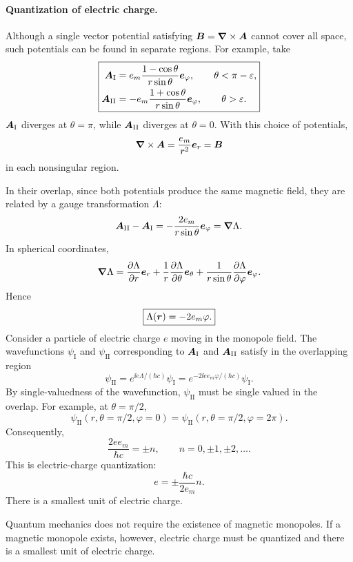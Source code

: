 \paragraph{Quantization of electric charge.}
Although a single vector potential satisfying $\bm{B}=\bm{\nabla}\times\bm{A}$ cannot cover all space, such potentials can be found in separate regions. For example, take
\begin{equation}
\boxed{\begin{aligned}
\bm{A}_{\mathrm I}&=e_m\frac{1-\cos\theta}{r\sin\theta}\bm{e}_\varphi,
\qquad\theta<\pi-\varepsilon,\\
\bm{A}_{\mathrm{II}}&=-e_m\frac{1+\cos\theta}{r\sin\theta}\bm{e}_\varphi,
\qquad\theta>\varepsilon.
\end{aligned}}
\end{equation}
$\bm{A}_{\mathrm I}$ diverges at $\theta=\pi$, while $\bm{A}_{\mathrm{II}}$ diverges at $\theta=0$. With this choice of potentials,
\begin{equation}
\bm{\nabla}\times\bm{A}=\frac{e_m}{r^2}\bm{e}_r=\bm{B}
\end{equation}
in each nonsingular region.

In their overlap, since both potentials produce the same magnetic field, they are related by a gauge transformation $\Lambda$:
\begin{equation}
\bm{A}_{\mathrm{II}}-\bm{A}_{\mathrm I}
=-\frac{2e_m}{r\sin\theta}\bm{e}_\varphi=\bm{\nabla}\Lambda.
\end{equation}
In spherical coordinates,
\begin{equation}
\bm{\nabla}\Lambda=\frac{\partial\Lambda}{\partial r}\bm{e}_r
+\frac1r\frac{\partial\Lambda}{\partial\theta}\bm{e}_\theta
+\frac1{r\sin\theta}\frac{\partial\Lambda}{\partial\varphi}\bm{e}_\varphi.
\end{equation}
Hence
\begin{equation}
\boxed{\Lambda(\bm{r})=-2e_m\varphi.}
\end{equation}
Consider a particle of electric charge $e$ moving in the monopole field. The wavefunctions $\psi_{\mathrm I}$ and $\psi_{\mathrm{II}}$ corresponding to $\bm{A}_{\mathrm I}$ and $\bm{A}_{\mathrm{II}}$ satisfy in the overlapping region
\begin{equation}
\psi_{\mathrm{II}}=e^{\ii e\Lambda/(\hbar c)}\psi_{\mathrm I}
=e^{-2\ii ee_m\varphi/(\hbar c)}\psi_{\mathrm I}.
\end{equation}
By single-valuedness of the wavefunction, $\psi_{\mathrm{II}}$ must be single valued in the overlap. For example, at $\theta=\pi/2$,
\begin{equation}
\psi_{\mathrm{II}}(r,\theta=\pi/2,\varphi=0)
=\psi_{\mathrm{II}}(r,\theta=\pi/2,\varphi=2\pi).
\end{equation}
Consequently,
\begin{equation}
\frac{2ee_m}{\hbar c}=\pm n,\qquad n=0,\pm1,\pm2,\ldots.
\end{equation}
This is electric-charge quantization:
\begin{equation}
\boxed{e=\pm\frac{\hbar c}{2e_m}n.}
\end{equation}
There is a smallest unit of electric charge.

Quantum mechanics does not require the existence of magnetic monopoles. If a magnetic monopole exists, however, electric charge must be quantized and there is a smallest unit of electric charge.